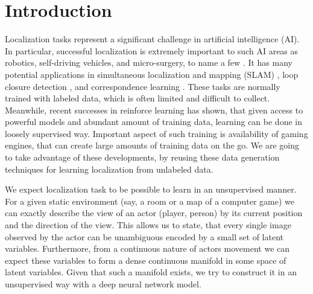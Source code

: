 
\chapter{Introduction}
\label{ch:intro}

%
%
%

Localization tasks represent a significant challenge in artificial intelligence (AI).
In particular, successful localization is extremely important to such AI areas as robotics, self-driving vehicles, and micro-surgery, to name a few \cite{Wang2017, Mountney2006}.
It has many potential applications in simultaneous localization and mapping (SLAM) \cite{Cadena2015, Zikos2016}, loop closure detection \cite{Xia2016, Gao2015a, Huang2016}, and correspondence learning \cite{Boscaini2016}.
These tasks are normally trained with labeled data, which is often limited and difficult to collect.
Meanwhile, recent successes in reinforce learning \cite{Silver, Lample2016} has shown, that given access to powerful models and abundant amount of training data, learning can be done in loosely supervised way.
Important aspect of such training is availability of gaming engines, that can create large amounts of training data on the go.
We are going to take advantage of these developments, by reusing these data generation techniques for learning localization from unlabeled data.

We expect localization task to be possible to learn in an unsupervised manner.
For a given static environment (say, a room or a map of a computer game) we can exactly describe the view of an actor (player, person) by its current position and the direction of the view.
This allows us to state, that every single image observed by the actor can be unambiguous encoded by a small set of latent variables.
Furthermore, from a continuous nature of actors movement we can expect these variables to form a dense continuous manifold in some space of latent variables.
Given that such a manifold exists, we try to construct it in an unsupervised way with a deep neural network model.

